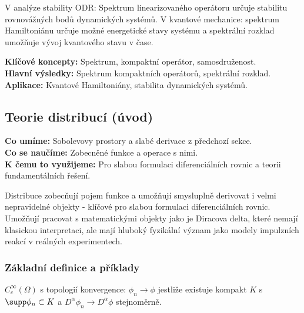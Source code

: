 \begin{application}
V analýze stability ODR: Spektrum linearizovaného operátoru určuje stabilitu rovnovážných bodů dynamických systémů. V kvantové mechanice: spektrum Hamiltoniánu určuje možné energetické stavy systému a spektrální rozklad umožňuje vývoj kvantového stavu v čase.
\end{application}

\begin{summary}
\textbf{Klíčové koncepty:} Spektrum, kompaktní operátor, samosdruženost. \\
\textbf{Hlavní výsledky:} Spektrum kompaktních operátorů, spektrální rozklad. \\
\textbf{Aplikace:} Kvantové Hamiltoniány, stabilita dynamických systémů.
\end{summary}

\spc

\subsection{Teorie distribucí (úvod)}

\begin{scaffold}
\textbf{Co umíme:} Sobolevovy prostory a slabé derivace z předchozí sekce. \\
\textbf{Co se naučíme:} Zobecněné funkce a operace s nimi. \\
\textbf{K čemu to využijeme:} Pro slabou formulaci diferenciálních rovnic a teorii fundamentálních řešení.
\end{scaffold}

\begin{motivation}
Distribuce zobecňují pojem funkce a umožňují smysluplně derivovat i velmi nepravidelné objekty - klíčové pro slabou formulaci diferenciálních rovnic. Umožňují pracovat s matematickými objekty jako je Diracova delta, které nemají klasickou interpretaci, ale mají hluboký fyzikální význam jako modely impulzních reakcí v reálných experimentech.
\end{motivation}

\subsubsection{Základní definice a příklady}

\begin{definition}
$C_c^\infty(\Omega)$ s topologií konvergence: $\phi_n \to \phi$ jestliže existuje kompakt $K$ s $\supp \phi_n \subset K$ a $D^\alpha \phi_n \to D^\alpha \phi$ stejnoměrně.
\end{definition}

